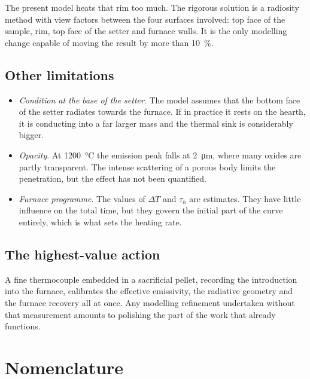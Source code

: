 \documentclass[11pt,a4paper]{article}
\begin{document}
The present model heats that rim too much. The rigorous solution is a
radiosity method with view factors between the four surfaces involved: top
face of the sample, rim, top face of the setter and furnace walls. It is
the only modelling change capable of moving the result by more than
\SI{10}{\percent}.

\subsection{Other limitations}

\begin{itemize}
\item \emph{Condition at the base of the setter}. The model assumes that
the bottom face of the setter radiates towards the furnace. If in practice
it rests on the hearth, it is conducting into a far larger mass and the
thermal sink is considerably bigger.

\item \emph{Opacity}. At \SI{1200}{\celsius} the emission peak falls at
\SI{2}{\micro\meter}, where many oxides are partly transparent. The intense
scattering of a porous body limits the penetration, but the effect has not
been quantified.

\item \emph{Furnace programme}. The values of $\Delta T$ and $\tau_{h}$ are
estimates. They have little influence on the total time, but they govern
the initial part of the curve entirely, which is what sets the heating
rate.
\end{itemize}

\subsection{The highest-value action}

A fine thermocouple embedded in a sacrificial pellet, recording the
introduction into the furnace, calibrates the effective emissivity, the
radiative geometry and the furnace recovery all at once. Any modelling
refinement undertaken without that measurement amounts to polishing the
part of the work that already functions.

\section{Nomenclature}
\end{document}
